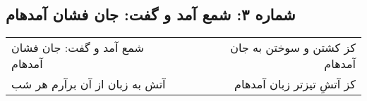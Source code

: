 \begin{center}
\section*{شماره ۳: شمع آمد و گفت: جان فشان آمدهام}
\label{sec:003}
\begin{longtable}{l p{0.5cm} r}
شمع آمد و گفت: جان فشان آمدهام
&&
کز کشتن و سوختن به جان آمدهام
\\
آتش به زبان از آن برآرم هر شب
&&
کز آتشِ تیزتر زبان آمدهام
\\
\end{longtable}
\end{center}
